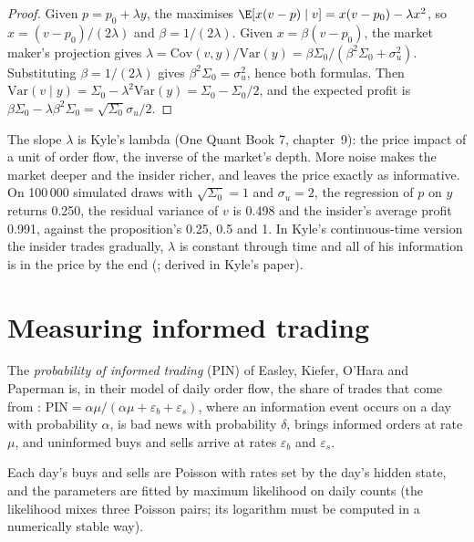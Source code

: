 \begin{proof}
Given $p=p_0+\lambda y$, the  maximises $\E[x(v-p)\mid v]=x(v-p_0)-\lambda x^2$, so $x=(v-p_0)/(2\lambda)$ and $\beta=1/(2\lambda)$. Given
$x=\beta(v-p_0)$, the market maker's projection gives $\lambda=\mathrm{Cov}(v,y)/\mathrm{Var}(y)=\beta\Sigma_0/(\beta^2\Sigma_0+\sigma_u^2)$. Substituting
$\beta=1/(2\lambda)$ gives $\beta^2\Sigma_0=\sigma_u^2$, hence both formulas. Then $\mathrm{Var}(v\mid y)=\Sigma_0-\lambda^2\mathrm{Var}(y)=\Sigma_0-\Sigma_0/2$,
and the expected profit is $\beta\Sigma_0-\lambda\beta^2\Sigma_0=\sqrt{\Sigma_0}\sigma_u/2$.
\end{proof}

The slope $\lambda$ is Kyle's lambda (One Quant Book 7, chapter~9): the price impact of a unit of order flow, the inverse of the market's depth. More noise
makes the market deeper and the insider richer, and leaves the price exactly as informative. On 100\,000 simulated draws with $\sqrt{\Sigma_0}=1$ and
$\sigma_u=2$, the regression of $p$ on $y$ returns 0.250, the residual variance of $v$ is 0.498 and the insider's average profit 0.991, against the
proposition's 0.25, 0.5 and 1. In Kyle's continuous-time version the insider trades gradually, $\lambda$ is constant through time and all of his
information is in the price by the end (\admitted; derived in Kyle's paper).

\section{Measuring informed trading}

\begin{definition}\label{def:mx:why-there-is-a-spread:pin}
The \emph{probability of informed trading} (PIN) of Easley, Kiefer, O'Hara and Paperman is, in their model of daily
order flow, the share of trades that come from : $\mathrm{PIN}=\alpha\mu/(\alpha\mu+\varepsilon_b+\varepsilon_s)$, where an information event
occurs on a day with probability $\alpha$, is bad news with probability $\delta$, brings informed orders at rate $\mu$, and uninformed buys and sells arrive
at rates $\varepsilon_b$ and $\varepsilon_s$.
\end{definition}

Each day's buys and sells are Poisson with rates set by the day's hidden state, and the parameters are fitted by maximum likelihood on daily counts (the
likelihood mixes three Poisson pairs; its logarithm must be computed in a numerically stable way).

